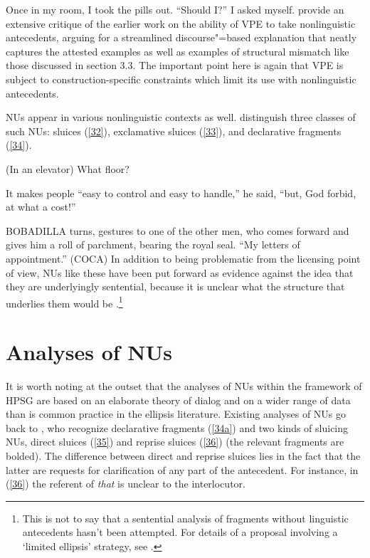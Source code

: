 \documentclass[output=paper
                ,modfonts
                ,nonflat
	        ,collection
	        ,collectionchapter
	        ,collectiontoclongg
 	        ,biblatex
                ,babelshorthands
                ,newtxmath
                ,draftmode
                ,colorlinks, citecolor=brown
]{./langsci/langscibook}
\begin{document}
{\ea Once in my room, I took the pills out. ``Should I?'' I asked myself. \citep[ex. 22a][]{Miller2014b}\label{31}\z
\citet{Miller2014b} provide an extensive critique of the earlier work on the ability of VPE to take nonlinguistic antecedents, arguing for a streamlined discourse"=based explanation that neatly captures the attested examples as well as examples of structural mismatch like those discussed in section 3.3. The important point here is again that VPE is subject to construction-specific constraints which limit its use with nonlinguistic antecedents.

NUs appear in various nonlinguistic contexts as well. \citet{Ginzburg2018} distinguish three classes of such NUs: sluices (\ref{32}), exclamative sluices (\ref{33}), and declarative fragments (\ref{34}).

\ea (In an elevator) What floor? \citep[298]{Ginzburg2000}\label{32}\z

\ea It makes people ``easy to control and easy to handle,'' he said, ``but, God forbid, at what a cost!''
\label{33}\z

\ea BOBADILLA turns, gestures to one of the other men, who comes forward and gives him a roll of parchment, bearing the royal seal. ``My letters of appointment.'' (COCA)\label{34}\z
In addition to being problematic from the licensing point of view, NUs like these have been put forward as evidence against the idea that they are underlyingly sentential, because it is unclear what the structure that underlies them would be \citep[see][]{Ginzburg2000, Culicover2005, Stainton2006}.\footnote{This is not to say that a sentential analysis of fragments without linguistic antecedents hasn't been attempted. For details of a proposal involving a `limited ellipsis' strategy, see \citet{Merchant2004}.}


\section{Analyses of NUs}
It is worth noting at the outset that the analyses of NUs within the framework of HPSG are based on an elaborate theory of dialog \citep{Ginzburg1994, Ginzburg2004, Ginzburg2014a, Larsson2002, Purver2006, Fernandez2006, Fernandez2002, Fernandez2007, Ginzburg2010, Ginzburg2014b, Ginzburg2012, Ginzburg2013} and on a wider range of data than is common practice in the ellipsis literature. Existing analyses of NUs go back to \citet{Ginzburg2000}, who recognize declarative fragments (\ref{34a}) and two kinds of sluicing NUs, direct sluices (\ref{35}) and reprise sluices (\ref{36}) (the relevant fragments are bolded). The difference between direct and reprise sluices lies in the fact that the latter are requests for clarification of any part of the antecedent. For instance, in (\ref{36}) the referent of {\it that} is unclear to the interlocutor.

}
\end{document}
